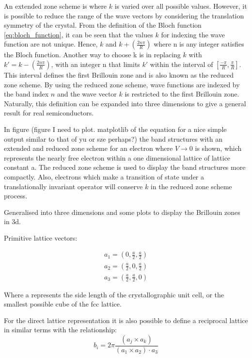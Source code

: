 An extended zone scheme is where $k$ is varied over all possible values. However, it is possible to reduce the range of the wave vectors by considering the translation symmetry of the crystal. From the definition of the Bloch function \ref{eq:bloch_function}, it can be seen that the values $k$ for indexing the wave function are not unique. Hence, $k$ and $k + \left(\frac{2n\pi}{R}\right)$ where n is any integer satisfies the Bloch function. Another way to choose k is in replacing $k$ with $k\prime = k - \left(\frac{2n\pi}{R}\right)$, with an integer n that limits $k\prime$ within the interval of $\left[\frac{-\pi}{R},\frac{\pi}{R}\right]$. This interval defines the first Brillouin zone and is also known as the reduced zone scheme. By using the reduced zone scheme, wave functions are indexed by the band index $n$ and the wave vector $k$ is restricted to the first Brillouin zone. Naturally, this definition can be expanded into three dimensions to give a general result for real semiconductors.

In figure (figure I need to plot. matplotlib of the equation for a nice simple output similar to that of yu or sze perhaps?) the band structures with an extended and reduced zone scheme for an electron where $V \rightarrow 0$ is shown, which represents the nearly free electron within a one dimensional lattice of lattice constant a. The reduced zone scheme is used to display the band structures more compactly. Also, electrons which make a transition of state under a translationally invariant operator will conserve $k$ in the reduced zone scheme process.

Generalised into three dimensions and some plots to display the Brillouin zones in 3d.

Primitive lattice vectors:

\begin{equation*}
    \begin{aligned}
        a_{1} = \left(0, \frac{a}{2}, \frac{a}{2}\right) \\a_{2} = \left(\frac{a}{2}, 0, \frac{a}{2}\right) \\a_{3} = \left(\frac{a}{2}, \frac{a}{2}, 0\right)
    \end{aligned}
    \label{eq:primitive_lattice_vectors}
\end{equation*}

Where a represents the side length of the crystallographic unit cell, or the smallest possible cube of the fcc lattice. 

For the direct lattice representation it is also possible to define a reciprocal lattice in similar terms with the relationship:
\begin{equation*}
    b_{i}=2\pi\frac{\left(a_{j}\times a_{k}\right)}{\left(a_{1}\times a_{2}\right)\cdot a_{3}}
    \label{eq:reciprocal_lattice_vectors}
\end{equation*}


